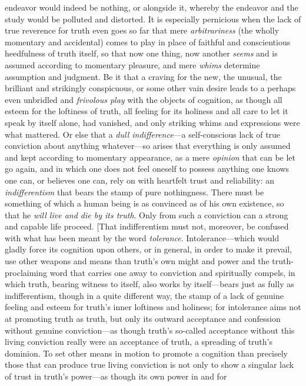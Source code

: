 \documentclass[12pt,a4paper]{book}
\begin{document}
endeavor would indeed be nothing, or alongside it, whereby the endeavor and the study would be
polluted and distorted. It is especially pernicious when the lack of true reverence for truth even
goes so far that mere \emph{arbitrariness} (the wholly momentary and accidental) comes to play in
place of faithful and conscientious heedfulness of truth itself, so that now one thing, now another
\emph{seems} and is assumed according to momentary pleasure, and mere \emph{whims} determine assumption and
judgment. Be it that a craving for the new, the unusual, the brilliant and strikingly conspicuous,
or some other vain desire leads to a perhaps even unbridled and \emph{frivolous play} with the
objects of cognition, as though all esteem for the loftiness of truth, all feeling for its holiness
and all care to let it speak by itself alone, had vanished, and only striking whims and expressions
were what mattered. Or else that a \emph{dull indifference}---a self-conscious lack of true
conviction about anything whatever---so arises that everything is only assumed and kept according to
momentary appearance, as a mere \emph{opinion} that can be let go again, and in which one does not
feel oneself to possess anything one knows one can, or believes one can, rely on with heartfelt
trust and reliability: an \emph{indifferentism} that bears the stamp of pure nothingness. There must
be something of which a human being is as convinced as of his own existence, so that he \emph{will
live and die by its truth}. Only from such a conviction can a strong and capable life proceed.
[That indifferentism must not, moreover, be confused with what has been meant by the word
\emph{tolerance}. Intolerance---which would gladly force its cognition upon others, or in general, in
order to make it prevail, use other weapons and means than truth's own might and power and the
truth-proclaiming word that carries one away to conviction and spiritually compels, in which truth,
bearing witness to itself, also works by itself---bears just as fully as indifferentism, though in a
quite different way, the stamp of a lack of genuine feeling and esteem for truth's inner loftiness
and holiness; for intolerance aims not at promoting truth as truth, but only its outward acceptance
and confession without genuine conviction---as though truth's so-called acceptance without this
living conviction really were an acceptance of truth, a spreading of truth's dominion. To set other
means in motion to promote a cognition than precisely those that can produce true living conviction
is not only to show a singular lack of trust in truth's power---as though its own power in and for
\end{document}
